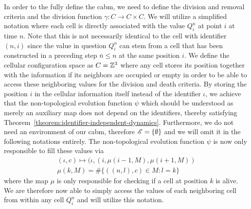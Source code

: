In order to the fully define the \ac{cabm}, we need to define the division and removal criteria and
the division function $\gamma:C\rightarrow C\times C$.
We will utilize a simplified notation where each cell is directly associated with the value $Q^n_i$
at point $i$ at time $n$.
Note that this is not necessarily identical to the cell with identifier $(n,i)$ since the value in
question $Q^n_i$ can stem from a cell that has been constructed in a preceding step $\bar{n}\leq n$
at the same position $i$.
We define the cellular configuration space as $C=\mathbb{Z}^3$ where any cell stores its position together
with the information if its neighbors are occupied or empty in order to be able to access these
neighboring values for the division and death criteria.
By storing the position $i$ in the cellular information itself instead of the identifier $\iota$, we
achieve that the non-topological evolution function $\psi$ which should be understood as merely an
auxiliary map does not depend on the identifiers, thereby satisfying
Theorem~\ref{theorem:identifier-independent-dynamics}.
Furthermore, we do not need an environment of our \ac{cabm}, therefore $\mathscr{E}=\{\emptyset\}$ and we
will omit it in the following notations entirely.
The non-topological evolution function $\psi$ is now only responsible to fill these values via
\begin{gather}
    (\iota,c)\mapsto (\iota,(i,\mu(i-1,M),\mu(i+1,M))
    \label{eq:ca-rule-110-psi-1}\\
    \mu(k,M) = \#\{((n,l),c)\in M:l=k\}
    \label{eq:ca-rule-110-psi-2}
\end{gather}
where the map $\mu$ is only responsible for checking if a cell at position $k$ is alive.
We are therefore now able to simply access the values of each neighboring cell from within any cell
$Q_i^n$ and will utilize this notation.

